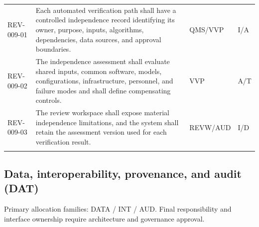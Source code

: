 \documentclass[11pt,letterpaper]{article}
\begin{document}
\begin{small}
\begin{longtable}{@{}L{0.135\textwidth}L{0.565\textwidth}L{0.125\textwidth}L{0.095\textwidth}@{}}
\addlinespace[2pt]
REV-009-01 & Each automated verification path shall have a controlled independence record identifying its owner, purpose, inputs, algorithms, dependencies, data sources, and approval boundaries. & QMS\slash\allowbreak{}VVP & I\slash\allowbreak{}A \\
\addlinespace[2pt]
REV-009-02 & The independence assessment shall evaluate shared inputs, common software, models, configurations, infrastructure, personnel, and failure modes and shall define compensating controls. & VVP & A\slash\allowbreak{}T \\
\addlinespace[2pt]
REV-009-03 & The review workspace shall expose material independence limitations, and the system shall retain the assessment version used for each verification result. & REVW\slash\allowbreak{}AUD & I\slash\allowbreak{}D \\
\addlinespace[2pt]
\end{longtable}
\end{small}

\subsection{Data, interoperability, provenance, and audit (DAT)}

Primary allocation families: DATA \slash\allowbreak{} INT \slash\allowbreak{} AUD. Final responsibility and interface ownership require architecture and governance approval.
\end{document}
